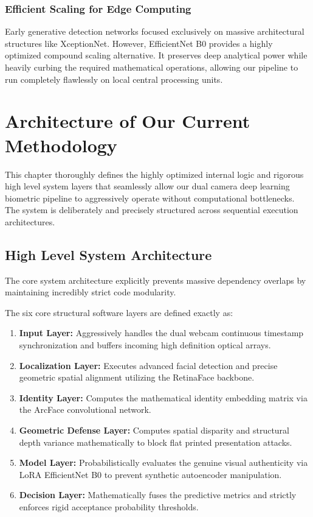 \documentclass[12pt,a4paper]{report}
\begin{document}
\subsection{Efficient Scaling for Edge Computing}
Early generative detection networks focused exclusively on massive architectural structures like XceptionNet. However, EfficientNet B0 provides a highly optimized compound scaling alternative. It preserves deep analytical power while heavily curbing the required mathematical operations, allowing our pipeline to run completely flawlessly on local central processing units.

\chapter{Architecture of Our Current Methodology}
This chapter thoroughly defines the highly optimized internal logic and rigorous high level system layers that seamlessly allow our dual camera deep learning biometric pipeline to aggressively operate without computational bottlenecks. The system is deliberately and precisely structured across sequential execution architectures.

\section{High Level System Architecture}
The core system architecture explicitly prevents massive dependency overlaps by maintaining incredibly strict code modularity. 

The six core structural software layers are defined exactly as:
\begin{enumerate}
    \item \textbf{Input Layer:} Aggressively handles the dual webcam continuous timestamp synchronization and buffers incoming high definition optical arrays.
    \item \textbf{Localization Layer:} Executes advanced facial detection and precise geometric spatial alignment utilizing the RetinaFace backbone.
    \item \textbf{Identity Layer:} Computes the mathematical identity embedding matrix via the ArcFace convolutional network.
    \item \textbf{Geometric Defense Layer:} Computes spatial disparity and structural depth variance mathematically to block flat printed presentation attacks.
    \item \textbf{Model Layer:} Probabilistically evaluates the genuine visual authenticity via LoRA EfficientNet B0 to prevent synthetic autoencoder manipulation.
    \item \textbf{Decision Layer:} Mathematically fuses the predictive metrics and strictly enforces rigid acceptance probability thresholds.
\end{enumerate}
\end{document}
